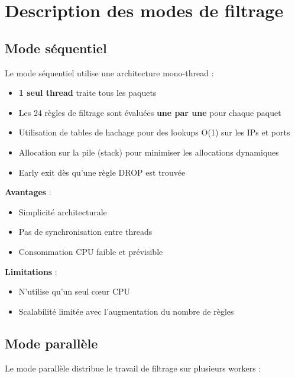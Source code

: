 \documentclass[12pt,a4paper]{article}
\begin{document}
\section{Description des modes de filtrage}

\subsection{Mode séquentiel}

Le mode séquentiel utilise une architecture mono-thread :

\begin{itemize}
    \item \textbf{1 seul thread} traite tous les paquets
    \item Les 24 règles de filtrage sont évaluées \textbf{une par une} pour chaque paquet
    \item Utilisation de tables de hachage pour des lookups O(1) sur les IPs et ports
    \item Allocation sur la pile (stack) pour minimiser les allocations dynamiques
    \item Early exit dès qu'une règle DROP est trouvée
\end{itemize}

\textbf{Avantages} :
\begin{itemize}
    \item Simplicité architecturale
    \item Pas de synchronisation entre threads
    \item Consommation CPU faible et prévisible
\end{itemize}

\textbf{Limitations} :
\begin{itemize}
    \item N'utilise qu'un seul cœur CPU
    \item Scalabilité limitée avec l'augmentation du nombre de règles
\end{itemize}

\subsection{Mode parallèle}

Le mode parallèle distribue le travail de filtrage sur plusieurs workers :
\end{document}
